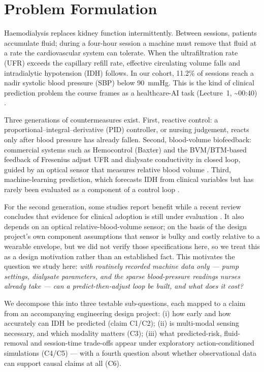 \documentclass{article}
\begin{document}
\section{Problem Formulation}

Haemodialysis replaces kidney function intermittently. Between sessions, patients accumulate fluid; during a four-hour session a machine must remove that fluid at a rate the cardiovascular system can tolerate. When the ultrafiltration rate (UFR) exceeds the capillary refill rate, effective circulating volume falls and intradialytic hypotension (IDH) follows. In our cohort, 11.2\% of sessions reach a nadir systolic blood pressure (SBP) below 90~mmHg. This is the kind of
clinical prediction problem the course frames as a healthcare-AI task (Lecture~1, \textasciitilde 00:40)
\citep{md6329lectures}.

Three generations of countermeasures exist. First, reactive control: a proportional--integral--derivative (PID) controller, or nursing judgement, reacts only after blood pressure has already fallen. Second, blood-volume biofeedback: commercial systems such as Hemocontrol (Baxter) and the BVM/BTM-based feedback of Fresenius adjust UFR and dialysate conductivity in closed loop, guided by an optical sensor that measures relative blood volume \citep{santoro1998biofeedback,ronco2000biofeedback,dong2024closedloop}. Third, machine-learning prediction, which forecasts IDH from clinical variables but has rarely been evaluated as a component of a control loop \citep{bi2022lstm,idhmstf2025}.

For the second generation, some studies report benefit while a recent review concludes that evidence for clinical adoption
is still under evaluation \citep{dong2024closedloop}. It also depends on an optical relative-blood-volume sensor; on the
basis of the design project's own component assumptions that sensor is bulky and costly relative to a wearable envelope, but
we did not verify those specifications here, so we treat this as a design motivation rather than an established fact. This motivates the question we study here: \emph{with routinely recorded machine data only --- pump settings, dialysate parameters, and the sparse blood-pressure readings nurses already take --- can a predict-then-adjust loop be built, and what does it cost?}

We decompose this into three testable sub-questions, each mapped to a claim from an accompanying engineering design project: (i) how early and how accurately can IDH be predicted (claim C1/C2); (ii) is multi-modal sensing necessary, and which modality matters (C3); (iii) what predicted-risk, fluid-removal and session-time trade-offs appear under exploratory action-conditioned simulations
(C4/C5) --- with a fourth question about whether observational data can support causal claims at all (C6).
\end{document}
